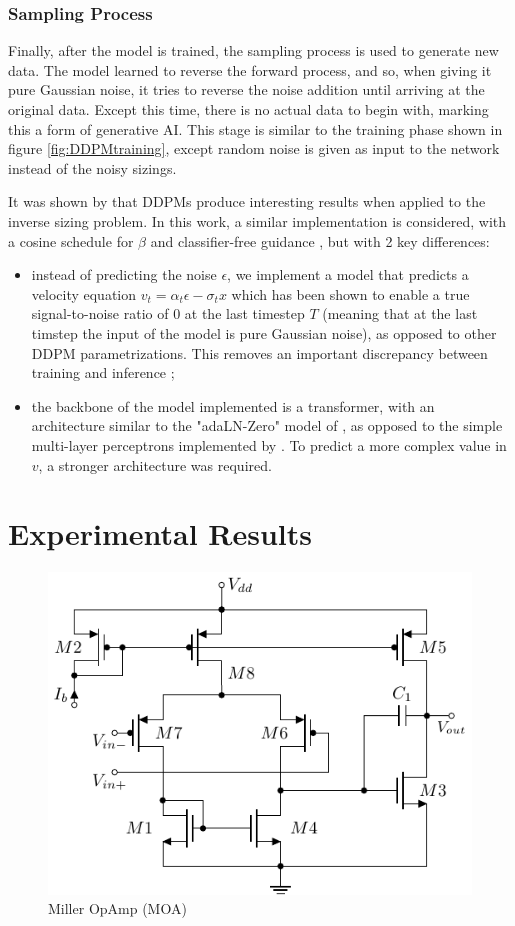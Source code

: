 \documentclass[conference]{IEEEtran}
\begin{document}
	\subsubsection{Sampling Process}
	Finally, after the model is trained, the sampling process is used to generate new data. The model learned to reverse the forward process, and so, when giving it pure Gaussian noise, it tries to reverse the noise addition until arriving at the original data. Except this time, there is no actual data to begin with, marking this a form of generative AI. This stage is similar to the training phase shown in figure \ref{fig:DDPMtraining}, except random noise is given as input to the network instead of the noisy sizings.
	
	It was shown by \cite{eid24diffusion} that DDPMs produce interesting results when applied to the inverse sizing problem. In this work, a similar implementation is considered, with a cosine schedule for $\beta$ and classifier-free guidance \cite{ho2022classifierfreediffusionguidance}, but with 2 key differences:
	
	\begin{itemize}
		\item instead of predicting the noise $\epsilon$, we implement a model that predicts a velocity equation $v_{t}=\alpha_{t}\epsilon - \sigma_{t}x$ which has been shown to enable a true signal-to-noise ratio of $0$ at the last timestep $T$ (meaning that at the last timstep the input of the model is pure Gaussian noise), as opposed to other DDPM parametrizations. This removes an important discrepancy between training and inference \cite{lin2024commondiffusionnoiseschedules};
		\item the backbone of the model implemented  is a transformer, with an architecture similar to the "adaLN-Zero" model of  \cite{peebles2023scalablediffusionmodelstransformers}, as opposed to the simple multi-layer perceptrons implemented by \cite{eid24diffusion}. To predict a more complex value in $v$, a stronger architecture was required.
	\end{itemize}
	
	
	
	\section{Experimental Results} \label{sec:results}
	\begin{figure}[]
		\centering
		\includegraphics[width=.5\linewidth]{figures/miller_pmos}
		\caption{Miller OpAmp (MOA)}
		\label{fig:miller}
	\end{figure}
	
\end{document}

